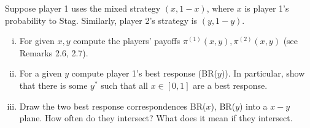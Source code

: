 \documentclass[10pt]{article}
\begin{document}
Suppose player 1 uses the mixed strategy \((x, 1- x)\), where \(x\) is player 1's
probability to Stag. Similarly, player 2's strategy is \((y, 1 - y)\).

\begin{enumerate}[(i)]
    \item For given \(x, y\) compute the players' payoffs \(\pi^{(1)}(x, y),
    \pi^{(2)}(x, y)\) (see Remarks 2.6, 2.7).
    \item For a given \(y\) compute player 1's best response (BR(\(y\))). In
    particular, show that there is some \(y^{*}\) such that all \(x \in [0,
    1]\) are a best response.
    \item Draw the two best response correspondences BR(\(x\)), BR(\(y\)) into a
    \(x-y\) plane. How often do they intersect? What does it mean if they
    intersect.
\end{enumerate}
\end{document}
